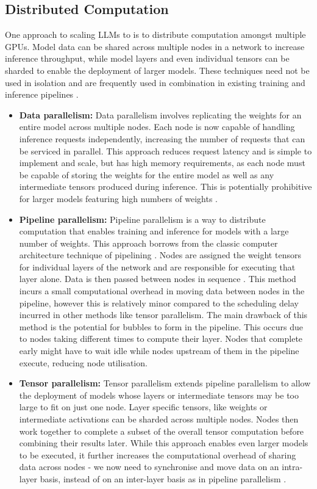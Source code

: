 \documentclass[11pt,twoside]{report}
\begin{document}
\subsection{Distributed Computation}
One approach to scaling LLMs to is to distribute computation amongst multiple GPUs. 
Model data can be shared across multiple nodes in a network to increase inference throughput, while model layers and even individual tensors can be sharded to enable the deployment of larger models.
These techniques need not be used in isolation and are frequently used in combination in existing training and inference pipelines \cite{kwon2023efficient} \cite{shoeybi2019megatron} \cite{yu2022orca}.
\begin{itemize}
  \item \textbf{Data parallelism:} Data parallelism involves replicating the weights for an entire model across multiple nodes.
    Each node is now capable of handling inference requests independently, increasing the number of requests that can be serviced in parallel.  
    This approach reduces request latency and is simple to implement and scale, but has high memory requirements, as each node must be capable of storing the weights for the entire model as well as any intermediate tensors produced during inference.
    This is potentially prohibitive for larger models featuring high numbers of weights \cite{rae2021scaling} \cite{brown2020language} \cite{chowdhery2023palm} .
  \item \textbf{Pipeline parallelism:} Pipeline parallelism is a way to distribute computation that enables training and inference for models with a large number of weights.
    This approach borrows from the classic computer architecture technique of pipelining \cite{hennessy2011computer}.
    Nodes are assigned the weight tensors for individual layers of the network and are responsible for executing that layer alone.
    Data is then passed between nodes in sequence \cite{huang2019gpipe}.
    This method incurs a small computational overhead in moving data between nodes in the pipeline, however this is relatively minor compared to the scheduling delay incurred in other methods like tensor parallelism.
    The main drawback of this method is the potential for bubbles to form in the pipeline.
    This occurs due to nodes taking different times to compute their layer.
    Nodes that complete early might have to wait idle while nodes upstream of them in the pipeline execute, reducing node utilisation.
  \item \textbf{Tensor parallelism:} Tensor parallelism extends pipeline parallelism to allow the deployment of models whose layers or intermediate tensors may be too large to fit on just one node.
    Layer specific tensors, like weights or intermediate activations can be sharded across multiple nodes. 
    Nodes then work together to complete a subset of the overall tensor computation before combining their results later.
    While this approach enables even larger models to be executed, it further increases the computational overhead of sharing data across nodes - we now need to synchronise and move data on an intra-layer basis, instead of on an inter-layer basis as in pipeline parallelism \cite{shoeybi2019megatron}.
\end{itemize}
\end{document}
